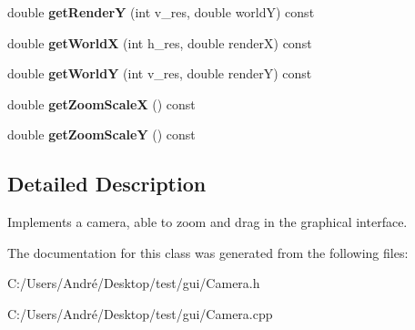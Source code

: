 \begin{DoxyCompactItemize}
\item 
\hypertarget{class_camera_a6af6702c0ef40d7cdb1d396a673af290}{}double {\bfseries get\+Render\+Y} (int v\+\_\+res, double world\+Y) const \label{class_camera_a6af6702c0ef40d7cdb1d396a673af290}

\item 
\hypertarget{class_camera_a509ea65044ffbd771f2ca3aa72040ef5}{}double {\bfseries get\+World\+X} (int h\+\_\+res, double render\+X) const \label{class_camera_a509ea65044ffbd771f2ca3aa72040ef5}

\item 
\hypertarget{class_camera_acfe0129236a227ab6203f83421552c83}{}double {\bfseries get\+World\+Y} (int v\+\_\+res, double render\+Y) const \label{class_camera_acfe0129236a227ab6203f83421552c83}

\item 
\hypertarget{class_camera_acca75da7b31a6d894673250ece0eb9c1}{}double {\bfseries get\+Zoom\+Scale\+X} () const \label{class_camera_acca75da7b31a6d894673250ece0eb9c1}

\item 
\hypertarget{class_camera_ae87bd07393cdd700fcc87d698d1011c2}{}double {\bfseries get\+Zoom\+Scale\+Y} () const \label{class_camera_ae87bd07393cdd700fcc87d698d1011c2}

\end{DoxyCompactItemize}


\subsection{Detailed Description}
Implements a camera, able to zoom and drag in the graphical interface. 

The documentation for this class was generated from the following files\+:\begin{DoxyCompactItemize}
\item 
C\+:/\+Users/\+André/\+Desktop/test/gui/Camera.\+h\item 
C\+:/\+Users/\+André/\+Desktop/test/gui/Camera.\+cpp\end{DoxyCompactItemize}
